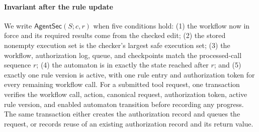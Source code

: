 \paragraph{Invariant after the rule update}
We write \(\mathsf{AgentSec}(S;c,r)\) when five conditions hold: (1) the workflow now in force and its required results come from the checked edit; (2) the stored nonempty execution set is the checker's largest safe execution set; (3) the workflow, authorization log, queue, and checkpoints match the processed-call sequence \(r\); (4) the automaton is in exactly the state reached after \(r\); and (5) exactly one rule version is active, with one rule entry and authorization token for every remaining workflow call.
For a submitted tool request, one transaction verifies the workflow call, action, canonical request, authorization token, active rule version, and enabled automaton transition before recording any progress.
The same transaction either creates the authorization record and queues the request, or records reuse of an existing authorization record and its return value.


